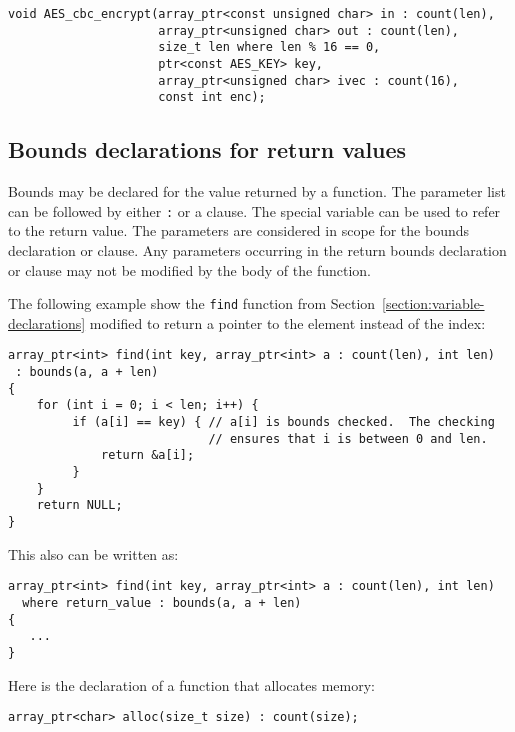 \begin{lstlisting}
void AES_cbc_encrypt(array_ptr<const unsigned char> in : count(len),
                     array_ptr<unsigned char> out : count(len),
                     size_t len where len % 16 == 0,
                     ptr<const AES_KEY> key,
                     array_ptr<unsigned char> ivec : count(16),
                     const int enc);
\end{lstlisting}

\subsection{Bounds declarations for return values}

Bounds may be declared for the value returned by a function. The
parameter list can be followed by either \texttt{:}  or
a  clause. The special variable  can
be used to refer to the return value. The parameters are considered in
scope for the bounds declaration or  clause. Any parameters
occurring in the return bounds declaration or  clause may
not be modified by the body of the function.

The following example show the \texttt{find} function from
Section~\ref{section:variable-declarations} modified
to return a pointer to the element instead of the index:

\begin{lstlisting}
array_ptr<int> find(int key, array_ptr<int> a : count(len), int len)
 : bounds(a, a + len)
{
    for (int i = 0; i < len; i++) {
         if (a[i] == key) { // a[i] is bounds checked.  The checking
                            // ensures that i is between 0 and len.
             return &a[i];
         }
    }
    return NULL;
}
\end{lstlisting}

This also can be written as:

\begin{lstlisting}
array_ptr<int> find(int key, array_ptr<int> a : count(len), int len)
  where return_value : bounds(a, a + len)
{
   ...
}
\end{lstlisting}
Here is the declaration of a function that allocates memory:

\begin{lstlisting}
array_ptr<char> alloc(size_t size) : count(size);
\end{lstlisting}



